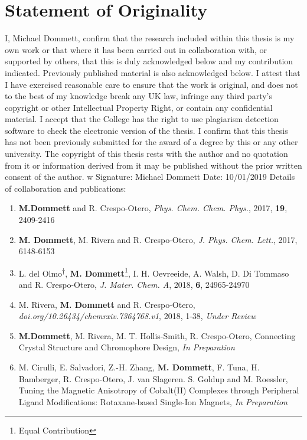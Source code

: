 \chapter*{Statement of Originality}
I, Michael Dommett, confirm that the research included within this thesis is my own work or that where it has been carried out in collaboration with, or supported by others, that this is duly acknowledged below and my contribution indicated. Previously published material is also acknowledged below.
I attest that I have exercised reasonable care to ensure that the work is original, and does not to the best of my knowledge break any UK law, infringe any third party's copyright or other Intellectual Property Right, or contain any confidential material.
I accept that the College has the right to use plagiarism detection software to check the electronic version of the thesis.
I confirm that this thesis has not been previously submitted for the award of a degree by this or any other university.
The copyright of this thesis rests with the author and no quotation from it or information derived from it may be published without the prior written consent of the author.
\newline
\newline
w
Signature: Michael Dommett 
Date: 10/01/2019
\newline
\newline
Details of collaboration and publications:
\begin{enumerate}
    \item \textbf{M.Dommett} and R. Crespo-Otero, \textit{Phys. Chem. Chem. Phys.}, 2017, \textbf{19}, 2409-2416
    \item \textbf{M. Dommett}, M. Rivera and R. Crespo-Otero, \textit{J. Phys. Chem. Lett.}, 2017, 6148-6153
    \item L. del Olmo\textsuperscript{$\dag$}, \textbf{M. Dommett}\footnote[2]{Equal Contribution}, I. H. Oevreeide, A. Walsh, D. Di Tommaso and R. Crespo-Otero, \textit{J. Mater. Chem. A}, 2018, \textbf{6}, 24965-24970
     \item M. Rivera, \textbf{M. Dommett}  and R. Crespo-Otero, \textit{doi.org/10.26434/chemrxiv.7364768.v1}, 2018, 1-38, \textit{Under Review}
     
    \item \textbf{M.Dommett}, M. Rivera, M. T. Hollis-Smith, R. Crespo-Otero, Connecting Crystal Structure and Chromophore Design, \textit{In Preparation}
    
    \item M. Cirulli, E. Salvadori, Z.-H. Zhang, \textbf{M. Dommett}, F. Tuna, H. Bamberger, R. Crespo-Otero, J. van Slageren. S. Goldup and M. Roessler, Tuning the Magnetic Anisotropy of Cobalt(II) Complexes through Peripheral Ligand Modifications: Rotaxane-based Single-Ion Magnets, \textit{In Preparation}

\end{enumerate}